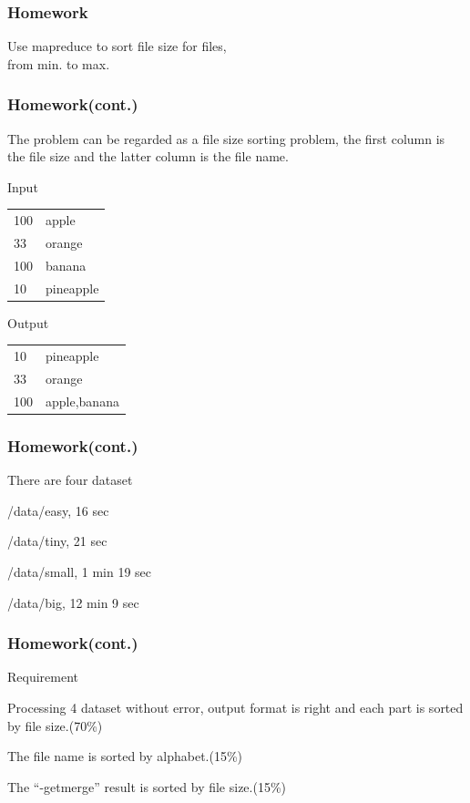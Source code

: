 \documentclass[12pt]{beamer}
\begin{document}
\begin{frame}
  \frametitle{Homework}
  \begin{center}
    {\Large Use mapreduce to sort file size for files,\\ from min. to max.}
  \end{center}
\end{frame}

\begin{frame}
  \frametitle{Homework(cont.)}
  The problem can be regarded as a file size sorting problem, the first column is the file size and the latter column is the file name.
  \begin{block}{Input}
    \begin{tabular}{ll}
      100 & apple\\
      33  & orange\\
      100 & banana \\
      10 & pineapple\\
    \end{tabular}
  \end{block}

  \begin{block}{Output}
    \begin{tabular}{ll}
      10 & pineapple\\
      33  & orange\\
      100 & apple,banana \\
    \end{tabular}
  \end{block}
\end{frame}

\begin{frame}
  \frametitle{Homework(cont.)}
  There are four dataset
  \begin{itemize}
    {\item /data/easy, 16 sec}
    {\item /data/tiny, 21 sec}
    {\item /data/small, 1 min 19 sec}
    {\item /data/big, 12 min 9 sec}
  \end{itemize}
\end{frame}

\begin{frame}
  \frametitle{Homework(cont.)}
  Requirement
  \begin{itemize}
    {\item Processing 4 dataset without error, output format is right and each part is sorted by file size.(70\%)}
    {\item The file name is sorted by alphabet.(15\%)}
    {\item The ``-getmerge'' result is sorted by file size.(15\%)}
  \end{itemize}
\end{frame}
\end{document}
